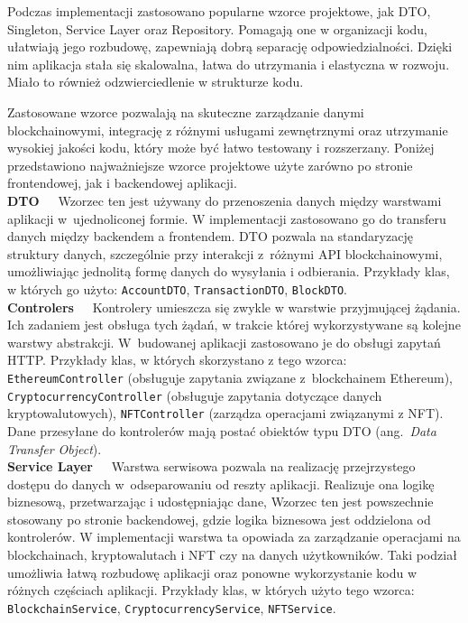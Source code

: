 Podczas implementacji zastosowano popularne wzorce projektowe, jak DTO, Singleton, Service Layer oraz Repository. Pomagają one w organizacji kodu, ułatwiają jego rozbudowę, zapewniają dobrą separację odpowiedzialności. Dzięki nim aplikacja stała się skalowalna, łatwa do utrzymania i elastyczna w rozwoju. Miało to również odzwierciedlenie w strukturze kodu.

Zastosowane wzorce pozwalają na skuteczne zarządzanie danymi blockchainowymi, integrację z różnymi usługami zewnętrznymi oraz utrzymanie wysokiej jakości kodu, który może być łatwo testowany i rozszerzany. Poniżej przedstawiono najważniejsze wzorce projektowe użyte zarówno po stronie frontendowej, jak i backendowej aplikacji.\\[-10pt]

\noindent \textbf{DTO~~}
Wzorzec ten jest używany do przenoszenia danych między warstwami aplikacji w~ujednoliconej formie. W implementacji zastosowano go do transferu danych między backendem a frontendem. DTO pozwala na standaryzację struktury danych, szczególnie przy interakcji z~różnymi API blockchainowymi, umożliwiając jednolitą formę danych do wysyłania i odbierania. Przykłady klas, w których go użyto: \texttt{AccountDTO}, \texttt{TransactionDTO}, \texttt{BlockDTO}.\\[-10pt]

\noindent \textbf{Controlers~~}
Kontrolery umieszcza się zwykle w warstwie przyjmującej żądania. Ich zadaniem jest obsługa tych żądań, w trakcie której wykorzystywane są kolejne warstwy abstrakcji.
W~budowanej aplikacji zastosowano je do obsługi zapytań HTTP. Przykłady klas, w których skorzystano z tego wzorca: \texttt{EthereumController} (obsługuje zapytania związane z~blockchainem Ethereum), \texttt{CryptocurrencyController} (obsługuje zapytania dotyczące danych kryptowalutowych), \texttt{NFTController} (zarządza operacjami związanymi z NFT). Dane przesyłane do kontrolerów mają postać obiektów typu DTO (ang.~\emph{Data Transfer Object}).\\[-10pt]

\noindent \textbf{Service Layer~~}
Warstwa serwisowa pozwala na realizację przejrzystego dostępu do danych w~odseparowaniu od reszty aplikacji. Realizuje ona logikę biznesową, przetwarzając i udostępniając dane, Wzorzec ten jest powszechnie stosowany po stronie backendowej, gdzie logika biznesowa jest oddzielona od kontrolerów. 
W implementacji warstwa ta opowiada za zarządzanie operacjami na blockchainach, kryptowalutach i NFT czy na danych użytkowników.
Taki podział umożliwia łatwą rozbudowę aplikacji oraz ponowne wykorzystanie kodu w różnych częściach aplikacji.
Przykłady klas, w których użyto tego wzorca: \texttt{BlockchainService}, \texttt{CryptocurrencyService}, \texttt{NFTService}.\\[-10pt]


